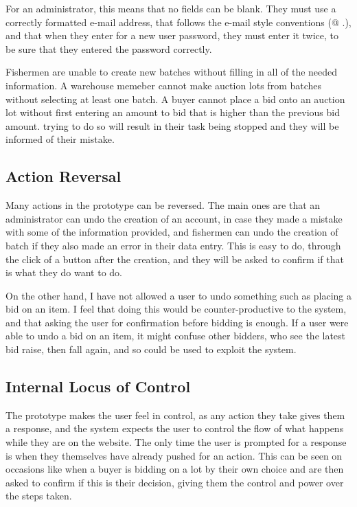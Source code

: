 \documentclass{article}
\begin{document}
For an administrator, this means that no fields can be blank. They must use a correctly formatted e-mail address, that follows the e-mail style conventions (@ .), and that when they enter for a new user password, they must enter it twice, to be sure that they entered the password correctly.

Fishermen are unable to create new batches without filling in all of the needed information. A warehouse memeber cannot make auction lots from batches without selecting at least one batch. A buyer cannot place a bid onto an auction lot without first entering an amount to bid that is higher than the previous bid amount. trying to do so will result in their task being stopped and they will be informed of their mistake.

\subsection{Action Reversal}
Many actions in the prototype can be reversed. The main ones are that an administrator can undo the creation of an account, in case they made a mistake with some of the information provided, and fishermen can undo the creation of batch if they also made an error in their data entry. This is easy to do, through the click of a button after the creation, and they will be asked to confirm if that is what they do want to do.

On the other hand, I have not allowed a user to undo something such as placing a bid on an item. I feel that doing this would be counter-productive to the system, and that asking the user for confirmation before bidding is enough. If a user were able to undo a bid on an item, it might confuse other bidders, who see the latest bid raise, then fall again, and so could be used to exploit the system.

\subsection{Internal Locus of Control}
The prototype makes the user feel in control, as any action they take gives them a response, and the system expects the user to control the flow of what happens while they are on the website. The only time the user is prompted for a response is when they themselves have already pushed for an action. This can be seen on occasions like when a buyer is bidding on a lot by their own choice and are then asked to confirm if this is their decision, giving them the control and power over the steps taken.
\end{document}
